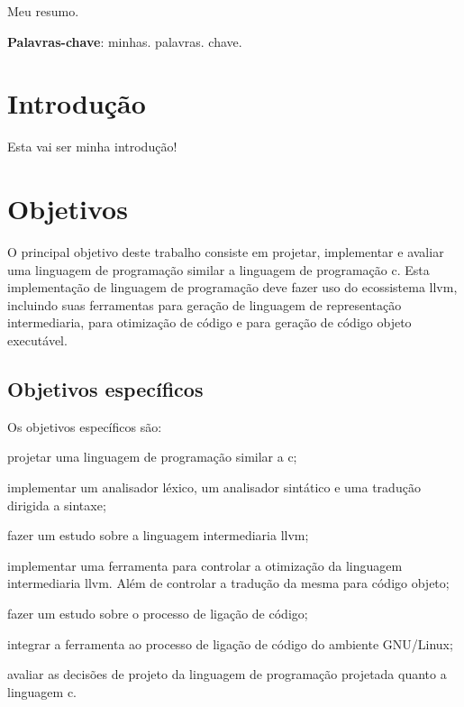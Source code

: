 \documentclass[
  12pt,
  openright,
  twoside,
  a4paper,
  english,
  brazil
]{abntex2}
\begin{document}
\pretextual{}
\hypersetup{pageanchor=false}
\imprimircapa{}
\hypersetup{pageanchor=true}
\imprimirfolhaderosto{}

\begin{folhadeaprovacao}
  
\end{folhadeaprovacao}

\begin{resumo}
Meu resumo.

\vspace{\onelineskip}
\noindent
\textbf{Palavras-chave}: minhas\@. palavras\@. chave.

\end{resumo}

\begin{KeepFromToc}
  \tableofcontents
\end{KeepFromToc}

\textual{}

\chapter{Introdução}\label{cap:introducao}

Esta vai ser minha introdução\cite{dijkstra1968}!

\chapter{Objetivos}\label{cap:objetivos}

O principal objetivo deste trabalho consiste em projetar, implementar e avaliar uma linguagem de programação similar a linguagem de programação c.
Esta implementação de linguagem de programação deve fazer uso do ecossistema llvm, incluindo suas ferramentas para geração de linguagem de representação intermediaria, para otimização de código e para geração de código objeto executável.

\section{Objetivos específicos}

Os objetivos específicos são:
\begin{alineas}
  \item projetar uma linguagem de programação similar a c;
  \item implementar um analisador léxico, um analisador sintático e uma tradução dirigida a sintaxe;
  \item fazer um estudo sobre a linguagem intermediaria llvm;
  \item implementar uma ferramenta para controlar a otimização da linguagem intermediaria llvm. Além de controlar a tradução da mesma para código objeto;
  \item fazer um estudo sobre o processo de ligação de código;
  \item integrar a ferramenta ao processo de ligação de código do ambiente GNU/Linux;
  \item avaliar as decisões de projeto da linguagem de programação projetada quanto a linguagem c.
\end{alineas}
\end{document}
